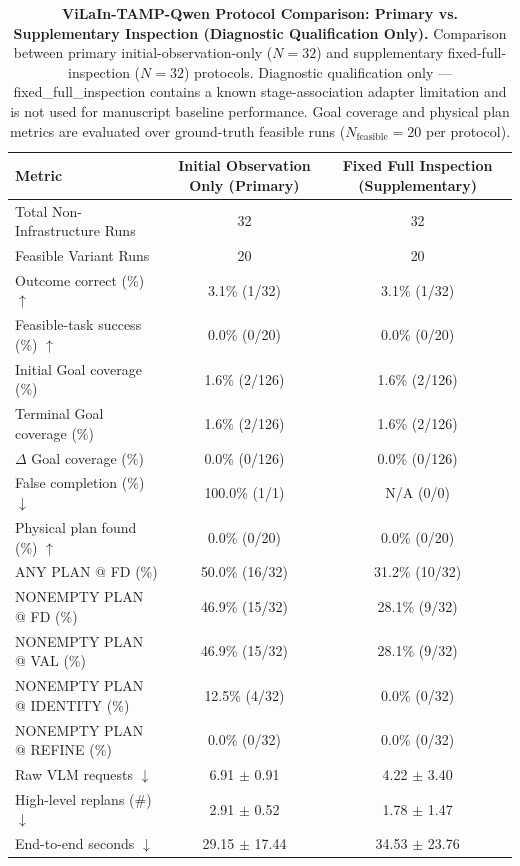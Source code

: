 \begin{table}[t]
\centering
\small
\caption{\textbf{ViLaIn-TAMP-Qwen Protocol Comparison: Primary vs. Supplementary Inspection (Diagnostic Qualification Only).}
Comparison between primary initial-observation-only ($N=32$) and supplementary fixed-full-inspection ($N=32$) protocols.
Diagnostic qualification only --- fixed\_full\_inspection contains a known stage-association adapter limitation and is not used for manuscript baseline performance.
Goal coverage and physical plan metrics are evaluated over ground-truth feasible runs ($N_{\text{feasible}}=20$ per protocol).}
\label{tab:vilain_protocol_comparison}
\begin{tabular}{l|cc}
\hline
\textbf{Metric} & \textbf{Initial Observation Only (Primary)} & \textbf{Fixed Full Inspection (Supplementary)} \\
\hline
Total Non-Infrastructure Runs & 32 & 32 \\
Feasible Variant Runs & 20 & 20 \\
\hline
Outcome correct (\%) $\uparrow$ & 3.1\% (1/32) & 3.1\% (1/32) \\
Feasible-task success (\%) $\uparrow$ & 0.0\% (0/20) & 0.0\% (0/20) \\
Initial Goal coverage (\%) & 1.6\% (2/126) & 1.6\% (2/126) \\
Terminal Goal coverage (\%) & 1.6\% (2/126) & 1.6\% (2/126) \\
$\Delta$ Goal coverage (\%) & 0.0\% (0/126) & 0.0\% (0/126) \\
False completion (\%) $\downarrow$ & 100.0\% (1/1) & N/A (0/0) \\
Physical plan found (\%) $\uparrow$ & 0.0\% (0/20) & 0.0\% (0/20) \\
ANY PLAN @ FD (\%) & 50.0\% (16/32) & 31.2\% (10/32) \\
NONEMPTY PLAN @ FD (\%) & 46.9\% (15/32) & 28.1\% (9/32) \\
NONEMPTY PLAN @ VAL (\%) & 46.9\% (15/32) & 28.1\% (9/32) \\
NONEMPTY PLAN @ IDENTITY (\%) & 12.5\% (4/32) & 0.0\% (0/32) \\
NONEMPTY PLAN @ REFINE (\%) & 0.0\% (0/32) & 0.0\% (0/32) \\
Raw VLM requests $\downarrow$ & 6.91 $\pm$ 0.91 & 4.22 $\pm$ 3.40 \\
High-level replans (\#) $\downarrow$ & 2.91 $\pm$ 0.52 & 1.78 $\pm$ 1.47 \\
End-to-end seconds $\downarrow$ & 29.15 $\pm$ 17.44 & 34.53 $\pm$ 23.76 \\
\hline
\end{tabular}
\end{table}
